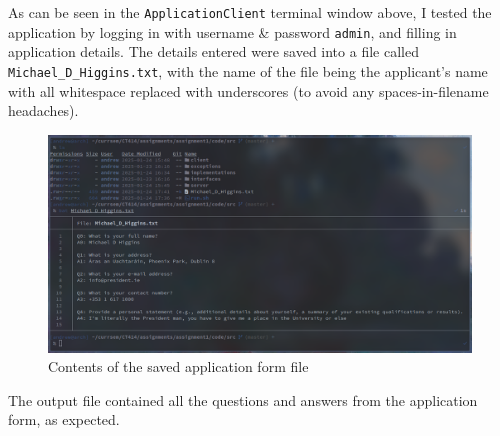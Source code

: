 \documentclass[a4paper]{article}
\begin{document}
As can be seen in the \texttt{ApplicationClient} terminal window above, I tested the application by logging in with username \& password \verb|admin|, and filling in application details.
The details entered were saved into a file called \verb|Michael_D_Higgins.txt|, with the name of the file being the applicant's name with all whitespace replaced with underscores (to avoid any spaces-in-filename headaches).

\begin{figure}[H]
    \centering
    \includegraphics[width=\textwidth]{./images/michaeld.png}
    \caption{Contents of the saved application form file}
\end{figure}

The output file contained all the questions and answers from the application form, as expected.
\end{document}
